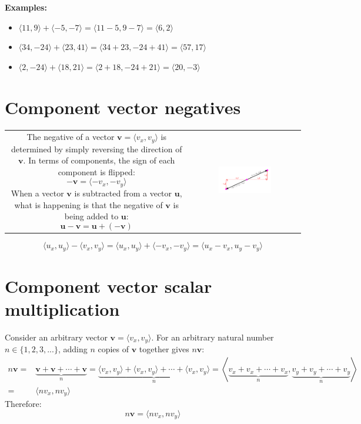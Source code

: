 \documentclass{article}
\begin{document}
\textbf{Examples:}
\begin{itemize}
\item \(\langle 11, 9 \rangle + \langle -5, -7 \rangle = \langle 11 - 5, 9 - 7 \rangle = \langle 6, 2 \rangle\)
\item \(\langle 34, -24 \rangle + \langle 23, 41 \rangle = \langle 34 + 23, -24 + 41 \rangle = \langle 57, 17 \rangle\)
\item \(\langle 2, -24 \rangle + \langle 18, 21 \rangle = \langle 2 + 18, -24 + 21 \rangle = \langle 20, -3 \rangle\)
\end{itemize}


\section*{Component vector negatives}

\begin{tabular}{cc}
\parbox{0.5\textwidth}{
The negative of a vector \(\mathbf{v} = \langle v_x, v_y \rangle\) is determined by simply reversing the direction of \(\mathbf{v}\). In terms of components, the sign of each component is flipped:
\[-\mathbf{v} = \langle -v_x, -v_y \rangle\]
When a vector \(\mathbf{v}\) is subtracted from a vector \(\mathbf{u}\), what is happening is that the negative of \(\mathbf{v}\) is being added to \(\mathbf{u}\): 
\[\mathbf{u} - \mathbf{v} = \mathbf{u} + (-\mathbf{v})\]
} & \parbox{0.5\textwidth}{
\includegraphics[width = 0.5\textwidth]{component_vector_negative}
}
\end{tabular}
\[\langle u_x, u_y \rangle - \langle v_x, v_y \rangle = \langle u_x, u_y \rangle + \langle -v_x, -v_y \rangle = \langle u_x - v_x, u_y - v_y \rangle\]


\section*{Component vector scalar multiplication}

Consider an arbitrary vector \(\mathbf{v} = \langle v_x, v_y \rangle\). For an arbitrary natural number \(n \in \{1, 2, 3, ...\}\), adding \(n\) copies of \(\mathbf{v}\) together gives \(n\mathbf{v}\):
\begin{align*}
n\mathbf{v} = & \underbrace{\mathbf{v} + \mathbf{v} + \cdots + \mathbf{v}}_n 
= \underbrace{\langle v_x, v_y \rangle + \langle v_x, v_y \rangle + \cdots + \langle v_x, v_y \rangle}_n 
= \left\langle \underbrace{v_x + v_x + \cdots + v_x}_n, \underbrace{v_y + v_y + \cdots + v_y}_n \right\rangle \\  
= & \langle n v_x, n v_y \rangle
\end{align*}
Therefore:
\[n\mathbf{v} = \langle n v_x, n v_y \rangle\]
\end{document}
